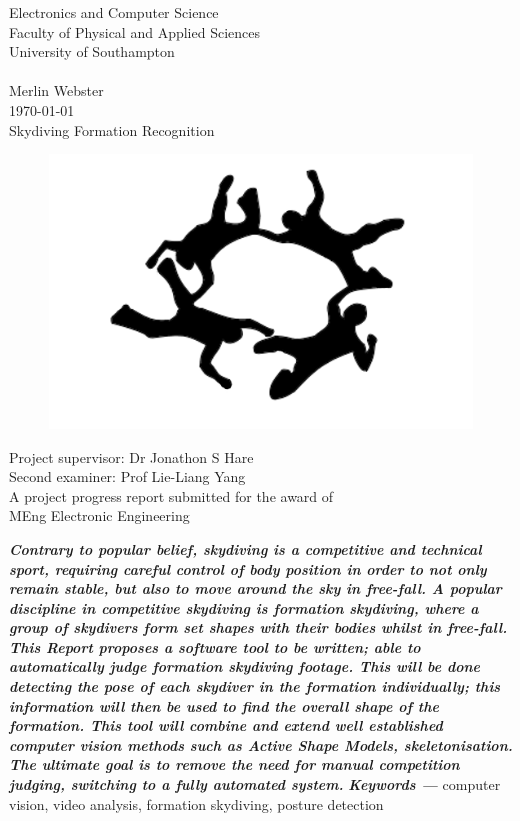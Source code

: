 \documentclass[a4paper, 12pt]{article}
\providecommand{\keywords}[1]{\textbf{\textit{Keywords ---}} #1}
\begin{document}
\begin{titlepage}
\begin{center}{\LARGE
Electronics and Computer Science\\
Faculty of Physical and Applied Sciences\\
University of Southampton\\
\hfill \break
\hfill \break
\hfill \break\\
Merlin Webster\\
\today\\
\hfill \break
Skydiving Formation Recognition\\
\begin{figure}[H]
	\centering
	\includegraphics[width=.7\linewidth]{fs_silhouette.png}
\end{figure}
Project supervisor: Dr Jonathon S Hare\\
Second examiner: Prof Lie-Liang Yang\\
\hfill \break
\hfill \break
A project progress report submitted for the award of\\
MEng Electronic Engineering\\}
\end{center}
\end{titlepage}
%
\renewenvironment{abstract}
  {\small\quotation
  {\bfseries\noindent{\large\abstractname}\par\nobreak\smallskip}}
  {\endquotation}
%
\thispagestyle{empty}
\setcounter{page}{0}
\begin{abstract}\textbf{\emph{
Contrary to popular belief, skydiving is a competitive and technical sport, requiring careful control of body position in order to not only remain stable, but also to move around the sky in free-fall. A popular discipline in competitive skydiving is formation skydiving, where a group of skydivers form set shapes with their bodies whilst in free-fall. This Report proposes a software tool to be written; able to automatically judge  formation skydiving footage. This will be done detecting the pose of each skydiver in the formation individually; this information will then be used to find the overall shape of the formation. This tool will combine and extend well established computer vision methods such as Active Shape Models, skeletonisation. The ultimate goal is to remove the need for manual competition judging, switching to a fully automated system.
}}\end{abstract}
\keywords{computer vision, video analysis, formation skydiving, posture detection}
\clearpage
%
\thispagestyle{empty}
\setcounter{page}{0}
\tableofcontents
\clearpage
\thispagestyle{empty}
\setcounter{page}{0}
\listoffigures 
\clearpage
\end{document}

